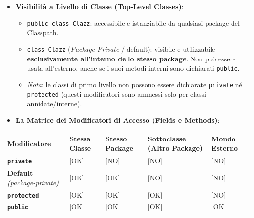 \documentclass[11pt,a4paper]{article}
\newcommand{\passthrough}[1]{#1}
\providecommand{\tightlist}{\setlength{\itemsep}{0pt}\setlength{\parskip}{0pt}}
\begin{document}
\begin{itemize}
\tightlist
\item
  \textbf{Visibilità a Livello di Classe (Top-Level Classes)}:

  \begin{itemize}
  \tightlist
  \item
    \passthrough{\lstinline!public class Clazz!}: accessibile e
    istanziabile da qualsiasi package del Classpath.
  \item
    \passthrough{\lstinline!class Clazz!} (\emph{Package-Private} /
    default): visibile e utilizzabile \textbf{esclusivamente all'interno
    dello stesso package}. Non può essere usata all'esterno, anche se i
    suoi metodi interni sono dichiarati
    \passthrough{\lstinline!public!}.
  \item
    \emph{Nota}: le classi di primo livello non possono essere
    dichiarate \passthrough{\lstinline!private!} né
    \passthrough{\lstinline!protected!} (questi modificatori sono
    ammessi solo per classi annidate/interne).
  \end{itemize}
\item
  \textbf{La Matrice dei Modificatori di Accesso (Fields e Methods)}:
\end{itemize}

\begin{longtable}[]{@{}
  >{\raggedright\arraybackslash}p{}
  >{\centering\arraybackslash}p{}
  >{\centering\arraybackslash}p{}
  >{\centering\arraybackslash}p{}
  >{\centering\arraybackslash}p{}@{}}
\toprule\noalign{}
\begin{minipage}[b]{\linewidth}\raggedright
Modificatore
\end{minipage} & \begin{minipage}[b]{\linewidth}\centering
Stessa Classe
\end{minipage} & \begin{minipage}[b]{\linewidth}\centering
Stesso Package
\end{minipage} & \begin{minipage}[b]{\linewidth}\centering
Sottoclasse (Altro Package)
\end{minipage} & \begin{minipage}[b]{\linewidth}\centering
Mondo Esterno
\end{minipage} \\
\midrule\noalign{}
\endhead
\bottomrule\noalign{}
\endlastfoot
\textbf{\passthrough{\lstinline!private!}} & {[}OK{]} & {[}NO{]} &
{[}NO{]} & {[}NO{]} \\
\textbf{Default} \emph{(package-private)} & {[}OK{]} & {[}OK{]} &
{[}NO{]} & {[}NO{]} \\
\textbf{\passthrough{\lstinline!protected!}} & {[}OK{]} & {[}OK{]} &
{[}OK{]} & {[}NO{]} \\
\textbf{\passthrough{\lstinline!public!}} & {[}OK{]} & {[}OK{]} &
{[}OK{]} & {[}OK{]} \\
\end{longtable}
\end{document}
